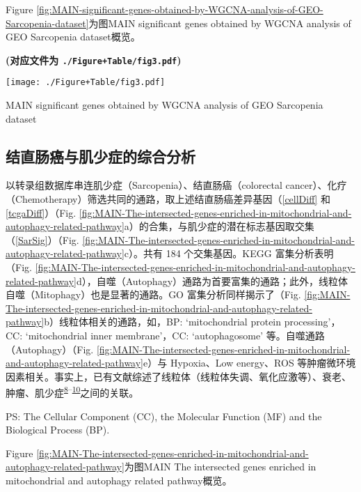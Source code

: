 \documentclass[
]{article}
\begin{document}
Figure \ref{fig:MAIN-significant-genes-obtained-by-WGCNA-analysis-of-GEO-Sarcopenia-dataset}为图MAIN significant genes obtained by WGCNA analysis of GEO Sarcopenia dataset概览。

\textbf{(对应文件为 \texttt{./Figure+Table/fig3.pdf})}

\def\@captype{figure}
\begin{center}
\texttt{[image: ./Figure+Table/fig3.pdf]}
\caption{MAIN significant genes obtained by WGCNA analysis of GEO Sarcopenia dataset}\label{fig:MAIN-significant-genes-obtained-by-WGCNA-analysis-of-GEO-Sarcopenia-dataset}
\end{center}

\hypertarget{ux7ed3ux76f4ux80a0ux764cux4e0eux808cux5c11ux75c7ux7684ux7efcux5408ux5206ux6790}{%
\subsection{结直肠癌与肌少症的综合分析}\label{ux7ed3ux76f4ux80a0ux764cux4e0eux808cux5c11ux75c7ux7684ux7efcux5408ux5206ux6790}}

以转录组数据库串连肌少症（Sarcopenia）、结直肠癌（colorectal cancer）、化疗（Chemotherapy）筛选共同的通路，取上述结直肠癌差异基因（\ref{cellDiff} 和 \ref{tcgaDiff}）（Fig. \ref{fig:MAIN-The-intersected-genes-enriched-in-mitochondrial-and-autophagy-related-pathway}a）的合集，与肌少症的潜在标志基因取交集（\ref{SarSig}）（Fig. \ref{fig:MAIN-The-intersected-genes-enriched-in-mitochondrial-and-autophagy-related-pathway}c）。共有 184 个交集基因。KEGG 富集分析表明（Fig. \ref{fig:MAIN-The-intersected-genes-enriched-in-mitochondrial-and-autophagy-related-pathway}d），自噬（Autophagy）通路为首要富集的通路；此外，线粒体自噬（Mitophagy）也是显著的通路。GO 富集分析同样揭示了（Fig. \ref{fig:MAIN-The-intersected-genes-enriched-in-mitochondrial-and-autophagy-related-pathway}b）线粒体相关的通路，如，BP: `mitochondrial protein processing'，CC: `mitochondrial inner membrane'，CC: `autophagosome' 等。自噬通路（Autophagy）（Fig. \ref{fig:MAIN-The-intersected-genes-enriched-in-mitochondrial-and-autophagy-related-pathway}e）与 Hypoxia、Low energy、ROS 等肿瘤微环境因素相关。事实上，已有文献综述了线粒体（线粒体失调、氧化应激等）、衰老、肿瘤、肌少症\textsuperscript{\protect\hyperlink{ref-MitochondrialDKudrya2016}{8}--\protect\hyperlink{ref-TheRoleOfAgiHavas2022}{10}}之间的关联。

PS: The Cellular Component (CC), the Molecular Function (MF) and the Biological Process (BP).

Figure \ref{fig:MAIN-The-intersected-genes-enriched-in-mitochondrial-and-autophagy-related-pathway}为图MAIN The intersected genes enriched in mitochondrial and autophagy related pathway概览。
\end{document}
